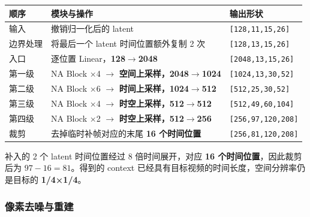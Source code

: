 \documentclass[
  11pt,
  a4paper,
  fontset=none]{ctexart}
\newcounter{none} %
\begin{document}
{\def\LTcaptype{none} %
\begin{longtable}[]{@{}
  >{\raggedright\arraybackslash}p{}
  >{\raggedright\arraybackslash}p{}
  >{\raggedright\arraybackslash}p{}@{}}
\toprule\noalign{}
\begin{minipage}[b]{\linewidth}\raggedright
顺序
\end{minipage} & \begin{minipage}[b]{\linewidth}\raggedright
模块与操作
\end{minipage} & \begin{minipage}[b]{\linewidth}\raggedright
输出形状
\end{minipage} \\
\midrule\noalign{}
\endhead
\bottomrule\noalign{}
\endlastfoot
输入 & 撤销归一化后的 latent & \texttt{{[}128,11,15,26{]}} \\
边界处理 & 将最后一个 latent 时间位置额外复制 2 次 &
\texttt{{[}128,13,15,26{]}} \\
入口 & 逐位置 Linear，\textbf{128\(\rightarrow\)2048} &
\texttt{{[}2048,13,15,26{]}} \\
第一级 & NA Block ×4 \(\rightarrow\)
\textbf{空间上采样，2048\(\rightarrow\)1024} &
\texttt{{[}1024,13,30,52{]}} \\
第二级 & NA Block ×6 \(\rightarrow\)
\textbf{时间上采样，1024\(\rightarrow\)512} &
\texttt{{[}512,25,30,52{]}} \\
第三级 & NA Block ×4 \(\rightarrow\)
\textbf{时空上采样，512\(\rightarrow\)512} &
\texttt{{[}512,49,60,104{]}} \\
第四级 & NA Block ×2 \(\rightarrow\)
\textbf{时空上采样，512\(\rightarrow\)256} &
\texttt{{[}256,97,120,208{]}} \\
裁剪 & 去掉临时补帧对应的末尾 \textbf{16 个时间位置} &
\texttt{{[}256,81,120,208{]}} \\
\end{longtable}
}

\endgroup

补入的 2 个 latent 时间位置经过 8 倍时间展开，对应 \textbf{16
个时间位置}，因此裁剪后为 \textbf{\(97-16=81\)}。得到的 context
已经具有目标视频的时间长度，空间分辨率仍是目标的 \textbf{1/4×1/4}。

\clearpage

\subsubsection{像素去噪与重建}\label{ltx25-pixel-decode}
\end{document}
